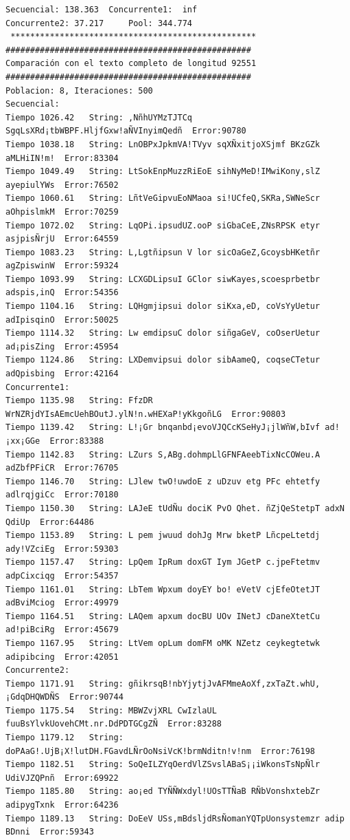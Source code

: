 \documentclass[a4paper,twocolumn,10pt]{article}
\begin{document}
\begin{center}
{\begin{verbatim}
Secuencial: 138.363	 Concurrente1:  inf
Concurrente2: 37.217	 Pool: 344.774 
 **************************************************
##################################################
Comparación con el texto completo de longitud 92551
##################################################
Poblacion: 8, Iteraciones: 500
Secuencial:
Tiempo 1026.42	 String: ,NñhUYMzTJTCq SgqLsXRd¡tbWBPF.HljfGxw!aÑVInyimQedñ	 Error:90780
Tiempo 1038.18	 String: LnOBPxJpkmVA!TVyv sqXÑxitjoXSjmf BKzGZk aMLHiIN!m!	 Error:83304
Tiempo 1049.49	 String: LtSokEnpMuzzRiEoE sihNyMeD!IMwiKony,slZ ayepiulYWs	 Error:76502
Tiempo 1060.61	 String: LñtVeGipvuEoNMaoa si!UCfeQ,SKRa,SWNeScr aOhpislmkM	 Error:70259
Tiempo 1072.02	 String: LqOPi.ipsudUZ.ooP siGbaCeE,ZNsRPSK etyr asjpisÑrjU	 Error:64559
Tiempo 1083.23	 String: L,Lgtñipsun V lor sicOaGeZ,GcoysbHKetñr agZpiswinW	 Error:59324
Tiempo 1093.99	 String: LCXGDLipsuI GClor siwKayes,scoesprbetbr adspis,inQ	 Error:54356
Tiempo 1104.16	 String: LQHgmjipsui dolor siKxa,eD, coVsYyUetur adIpisqinO	 Error:50025
Tiempo 1114.32	 String: Lw emdipsuC dolor siñgaGeV, coOserUetur ad¡pisZing	 Error:45954
Tiempo 1124.86	 String: LXDemvipsui dolor sibAameQ, coqseCTetur adQpisbing	 Error:42164
Concurrente1:
Tiempo 1135.98	 String: FfzDR WrNZRjdYIsAEmcUehBOutJ.ylN!n.wHEXaP!yKkgoñLG	 Error:90803
Tiempo 1139.42	 String: L!¡Gr bnqanbd¡evoVJQCcKSeHyJ¡jlWñW,bIvf ad!¡xx¡GGe	 Error:83388
Tiempo 1142.83	 String: LZurs S,ABg.dohmpLlGFNFAeebTixNcCOWeu.A adZbfPFiCR	 Error:76705
Tiempo 1146.70	 String: LJlew twO!uwdoE z uDzuv etg PFc ehtetfy adlrqjgiCc	 Error:70180
Tiempo 1150.30	 String: LAJeE tUdÑu dociK PvO Qhet. ñZjQeStetpT adxN QdiUp	 Error:64486
Tiempo 1153.89	 String: L pem jwuud dohJg Mrw bketP LñcpeLtetdj ady!VZciEg	 Error:59303
Tiempo 1157.47	 String: LpQem IpRum doxGT Iym JGetP c.jpeFtetmv adpCixciqg	 Error:54357
Tiempo 1161.01	 String: LbTem Wpxum doyEY bo! eVetV cjEfeOtetJT adBviMciog	 Error:49979
Tiempo 1164.51	 String: LAQem apxum docBU UOv INetJ cDaneXtetCu ad!piBciRg	 Error:45679
Tiempo 1167.95	 String: LtVem opLum domFM oMK NZetz ceykegtetwk adipibcing	 Error:42051
Concurrente2:
Tiempo 1171.91	 String: gñikrsqB!nbYjytjJvAFMmeAoXf,zxTaZt.whU,¡GdqDHQWDÑS	 Error:90744
Tiempo 1175.54	 String: MBWZvjXRL CwIzlaUL fuuBsYlvkUovehCMt.nr.DdPDTGCgZÑ	 Error:83288
Tiempo 1179.12	 String: doPAaG!.UjB¡X!lutDH.FGavdLÑrOoNsiVcK!brmNditn!v!nm	 Error:76198
Tiempo 1182.51	 String: SoQeILZYqOerdVlZSvslABaS¡¡iWkonsTsNpÑlr UdiVJZQPnñ	 Error:69922
Tiempo 1185.80	 String: ao¡ed TYÑÑWxdyl!UOsTTÑaB RÑbVonshxtebZr adipygTxnk	 Error:64236
Tiempo 1189.13	 String: DoEeV USs,mBdsljdRsÑomanYQTpUonsystemzr adip BDnni	 Error:59343

\end{verbatim}}
\end{center}
\end{document}
